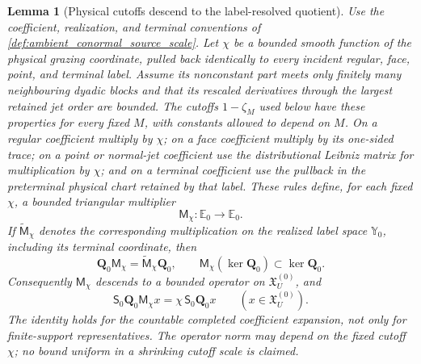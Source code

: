 \documentclass[11pt]{amsart}
\theoremstyle{compactplain}
\newtheorem{lemma}[theorem]{Lemma}
\theoremstyle{compactdefinition}
\theoremstyle{compactremark}
\begin{document}
\begin{lemma}[Physical cutoffs descend to the label-resolved quotient]
\label{lem:physical_cutoff_descends_to_source_quotient}
Use the coefficient, realization, and terminal conventions of
\cref{def:ambient_conormal_source_scale}.  Let \(\chi\) be a bounded smooth
function of the physical grazing coordinate, pulled back identically to every
incident regular, face, point, and terminal label.  Assume its nonconstant
part meets only finitely many neighbouring dyadic blocks and that its
rescaled derivatives through the largest retained jet order are bounded.  The
cutoffs \(1-\zeta_M\) used below have these properties for every fixed \(M\),
with constants allowed to depend on \(M\).  On a regular coefficient multiply
by \(\chi\); on a face coefficient multiply by its one-sided trace; on a
point or normal-jet coefficient use the distributional Leibniz matrix for
multiplication by \(\chi\); and on a terminal coefficient use the pullback in
the preterminal physical chart retained by that label.  These rules define,
for each fixed \(\chi\), a bounded triangular multiplier
\begin{equation}
\label{eq:physical_cutoff_coefficient_multiplier}
 \mathsf M_\chi:\mathbb E_0\longrightarrow\mathbb E_0.
\end{equation}
If \(\widetilde{\mathsf M}_\chi\) denotes the corresponding multiplication on
the realized label space \(\mathbb Y_0\), including its terminal coordinate,
then
\begin{equation}
\label{eq:physical_cutoff_realization_intertwining}
 \mathbf Q_0\mathsf M_\chi
 =\widetilde{\mathsf M}_\chi\mathbf Q_0,
 \qquad
 \mathsf M_\chi(\ker\mathbf Q_0)\subset\ker\mathbf Q_0.
\end{equation}
Consequently \(\mathsf M_\chi\) descends to a bounded operator on
\(\mathfrak X_U^{(0)}\), and
\begin{equation}
\label{eq:physical_cutoff_total_current_intertwining}
 \mathsf S_0\mathbf Q_0\mathsf M_\chi x
 =\chi\,\mathsf S_0\mathbf Q_0x
 \qquad(x\in\mathfrak X_U^{(0)}).
\end{equation}
The identity holds for the countable completed coefficient expansion, not only
for finite-support representatives.  The operator norm may depend on the
fixed cutoff \(\chi\); no bound uniform in a shrinking cutoff scale is claimed.
\end{lemma}
\end{document}
